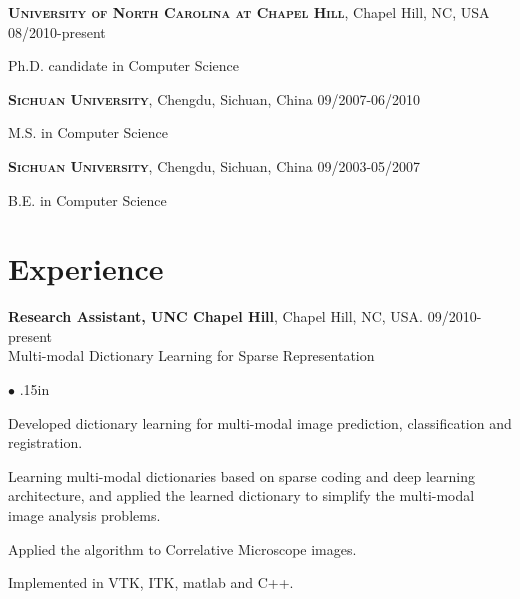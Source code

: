 \documentclass[line,margin]{res}
\newenvironment{bullets}{\begin{list}{\tiny$\bullet$}{\topsep 0pt \itemsep -2pt \leftmargin .15in}}{\vspace*{4pt}\end{list}}
\newenvironment{list1}{
  \begin{list}{\ding{113}}{%
      \setlength{\itemsep}{0in}
      \setlength{\parsep}{0in} \setlength{\parskip}{0in}
      \setlength{\topsep}{0in} \setlength{\partopsep}{0in} 
      \setlength{\leftmargin}{0.17in}}}{\end{list}}
\begin{document}
\begin{resume}
\textsc{\textbf{University of North Carolina at Chapel Hill}}, Chapel Hill, NC, USA \hfill{08/2010-present}\\
\vspace*{-.15in}
\begin{list1}
\item[] Ph.D. candidate in Computer Science %
\end{list1}
\vspace*{-.02in}
\textsc{\textbf{Sichuan University}}, Chengdu, Sichuan, China \hfill {09/2007-06/2010} \\
\vspace*{-.15in}
\begin{list1}
\item[] M.S. in Computer Science  %
\end{list1}
\vspace*{-.02in}
\textsc{\textbf{Sichuan University}}, Chengdu, Sichuan, China \hfill{09/2003-05/2007}\\
\vspace*{-.15in}
\begin{list1}
\item[] B.E. in Computer Science  %
\end{list1}

\vspace{-.05in}
\section{\sc Experience}
\smallskip

\textbf{Research Assistant, UNC Chapel Hill}, Chapel Hill, NC, USA.  \hfill      09/2010-present \\
Multi-modal Dictionary Learning for Sparse Representation %
\begin{bullets}
\item Developed dictionary learning for multi-modal image prediction, classification and registration. 
\item Learning multi-modal dictionaries based on sparse coding and deep learning architecture, and applied the learned dictionary to simplify the multi-modal image analysis problems. 
\item Applied the algorithm to Correlative Microscope images.
\item Implemented in VTK, ITK, matlab and C++.
\end{bullets}
\vspace{-.1in}


\end{resume}
\end{document}
